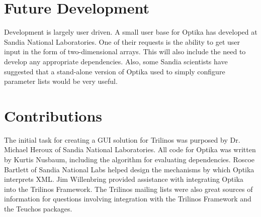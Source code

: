 \section{Future Development}
Development is largely user driven. A small user base for Optika has developed at Sandia National Laboratories. One of their requests is the ability to get user input in the 
form of two-dimensional arrays. This will also include the need to develop any appropriate dependencies. Also, some Sandia scientists have suggested that a stand-alone version 
of Optika used to simply configure parameter lists would be very useful. 

\section{Contributions}
The initial task for creating a GUI solution for Trilinos was purposed by Dr. Michael Heroux of Sandia National Laboratories. All code for Optika was written by Kurtis Nusbaum, 
including the algorithm for evaluating dependencies. Roscoe Bartlett of Sandia National Labs helped design the mechanisms by which Optika interprets XML. Jim Willenbring
provided assistance with integrating Optika into the Trilinos Framework. The Trilinos mailing lists were also great sources of information for questions involving integration 
with the Trilinos Framework and the Teuchos packages.
